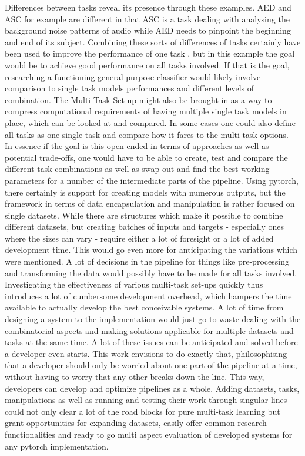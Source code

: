 Differences between tasks reveal its presence through these examples. AED and ASC for example are different in that ASC is a task dealing with analysing the background noise patterns of audio while AED needs to pinpoint the beginning and end of its subject. Combining these sorts of differences of tasks certainly have been used to improve the performance of one task \citep{imoto2020sound}, but in this example the goal would be to achieve good performance on all tasks involved. If that is the goal, researching a functioning general purpose classifier would likely involve comparison to single task models performances and different levels of combination. The Multi-Task Set-up might also be brought in as a way to compress computational requirements of having multiple single task models in place, which can be looked at and compared. In some cases one could also define all tasks as one single task and compare how it fares to the multi-task options.\\

In essence if the goal is this open ended in terms of approaches as well as potential trade-offs, one would have to be able to create, test and compare the different task combinations as well as swap out and find the best working parameters for a number of the intermediate parts of the pipeline. Using pytorch, there certainly is support for creating models with numerous outputs, but the framework in terms of data encapsulation and manipulation is rather focused on single datasets. While there are structures which make it possible to combine different datasets, but creating batches of inputs and targets - especially ones where the sizes can vary - require either a lot of foresight or a lot of added development time. This would go even more for anticipating the variations which were mentioned. A lot of decisions in the pipeline for things like pre-processing and transforming the data would possibly have to be made for all tasks involved. \\

Investigating the effectiveness of various multi-task set-ups quickly thus introduces a lot of cumbersome development overhead, which hampers the time available to actually develop the best conceivable systems. A lot of time from designing a system to the implementation would just go to waste dealing with the combinatorial aspects and making solutions applicable for multiple datasets and tasks at the same time. A lot of these issues can be anticipated and solved before a developer even starts. This work envisions to do exactly that, philosophising that a developer should only be worried about one part of the pipeline at a time, without having to worry that any other breaks down the line. This way, developers can develop and optimize pipelines as a whole. Adding datasets, tasks, manipulations as well as running and testing their work through singular lines could not only clear a lot of the road blocks for pure multi-task learning but grant opportunities for expanding datasets, easily offer common research functionalities and ready to go multi aspect evaluation of developed systems for any pytorch implementation.\\


